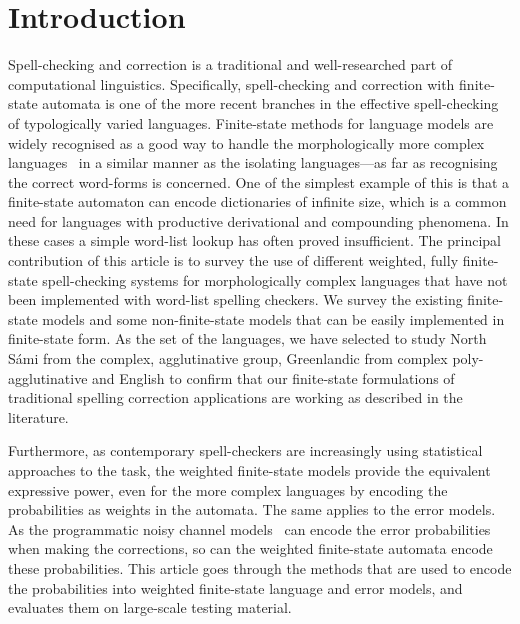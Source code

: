 \documentclass[a4paper,12pt]{article}
\begin{document}
\section{Introduction} 

Spell-checking and correction is a traditional and well-researched part of
computational linguistics. Specifically, spell-checking and
correction with finite-state automata is one of the more recent branches in the
effective spell-checking of typologically varied languages. Finite-state
methods for language models are widely recognised as a good way to handle the
morphologically more complex languages~\cite[]{beesley2003finite} in a similar
manner as the isolating languages---as far as recognising the correct
word-forms is concerned. One of the simplest example of this is that a
finite-state automaton can encode dictionaries of infinite size, which is a
common need for languages with productive derivational and compounding
phenomena.  In these cases a simple word-list lookup has often proved
insufficient. The principal contribution of this article is to survey the use
of different weighted, fully finite-state spell-checking systems for
morphologically complex languages that have not been implemented with
word-list spelling checkers.  We survey the existing finite-state models and
some non-finite-state models that can be easily implemented in finite-state
form.  As the set of the languages, we have selected to study North Sámi from
the complex, agglutinative group, Greenlandic from complex poly-agglutinative
and English to confirm that our finite-state formulations of traditional
spelling correction applications are working as described in the literature.

Furthermore, as contemporary spell-checkers are increasingly using statistical
approaches to the task, the weighted finite-state models provide the equivalent
expressive power, even for the more complex languages by encoding the
probabilities as weights in the automata.  The same applies to the error
models. As the programmatic noisy channel models~\cite[]{brill2000improved} can
encode the error probabilities when making the corrections, so can the weighted
finite-state automata encode these probabilities. This article goes through the
methods that are used to encode the probabilities into weighted finite-state
language and error models, and evaluates them on large-scale testing material.
\end{document}
